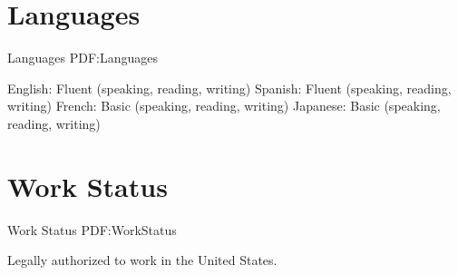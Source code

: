 \documentclass[letterpaper,MMMyyyy,nonstop]{simpleresumecv}
\begin{document}
\begin{body}

\section
{Languages}
{Languages}
{PDF:Languages}

\GapNoBreak
\BulletItem
English: Fluent (speaking, reading, writing)
\GapNoBreak
\BulletItem
Spanish: Fluent (speaking, reading, writing)
\GapNoBreak
\BulletItem
French: Basic (speaking, reading, writing)
\GapNoBreak
\BulletItem
Japanese: Basic (speaking, reading, writing)


\section
{Work Status}
{Work Status}
{PDF:WorkStatus}

Legally authorized to work in the United States.


%
%
%
%
%
\end{body}
\end{document}
